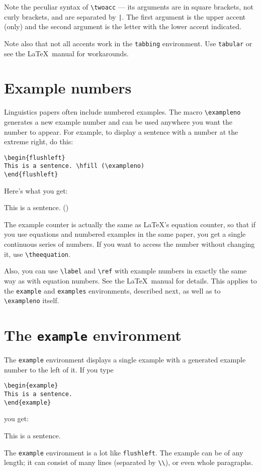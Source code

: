 \documentclass{article}
\begin{document}
Note the peculiar syntax of \verb.\twoacc. --- its arguments are in
square brackets, not curly brackets, and are separated by \verb.|..
The first argument is the upper accent (only) and the second argument
is the letter with the lower accent indicated.

Note also that not all accents work in the {\tt tabbing} environment.
Use {\tt tabular} or see the \LaTeX\ manual for workarounds.

\section{Example numbers}

Linguistics papers often include numbered examples.
The macro \verb"\exampleno" generates a new example number and can be 
used anywhere you want the number to appear.  For example, to display a 
sentence with a number at the extreme right, do this:
\begin{verbatim}
\begin{flushleft}
This is a sentence. \hfill (\exampleno)
\end{flushleft}
\end{verbatim}
Here's what you get:
\begin{flushleft}
This is a sentence. \hfill (\exampleno)
\end{flushleft}
The example counter is actually the same as \LaTeX's equation counter, 
so that if you use equations and numbered examples in the same
paper, you get a single continuous series of numbers. If you want to 
access the number without changing it, use \verb"\theequation".

Also, you can use \verb"\label" and \verb"\ref" with example numbers in 
exactly the same way as with equation numbers.  See the \LaTeX\ manual for
details. This applies to the {\tt example} and {\tt examples} 
environments, described next, as well as to \verb"\exampleno" itself.

\section{The {\tt example} environment}

The {\tt example} environment displays a single example
with a generated example number to the left of it.
If you type
\begin{verbatim}
\begin{example}
This is a sentence.
\end{example}
\end{verbatim}
you get:
\begin{example}
This is a sentence.
\end{example}
The {\tt example} environment is a lot like {\tt flushleft}. The example
can be of any length; it can consist of many lines (separated by \verb"\\"),
or even whole paragraphs.
\end{document}
